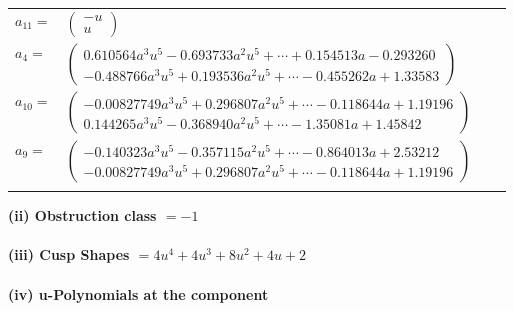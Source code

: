 \documentclass[1p]{elsarticle_modified}
\theoremstyle{definition}
\begin{document}
\begin{tabular}{m{7pt} m{180pt} m{7pt} m{180pt} }
\flushright $a_{11}=$&$\begin{pmatrix}- u\\u\end{pmatrix}$ \\
\flushright $a_{4}=$&$\begin{pmatrix}0.610564 a^{3} u^{5}-0.693733 a^{2} u^{5}+\cdots+0.154513 a-0.293260\\-0.488766 a^{3} u^{5}+0.193536 a^{2} u^{5}+\cdots-0.455262 a+1.33583\end{pmatrix}$ \\
\flushright $a_{10}=$&$\begin{pmatrix}-0.00827749 a^{3} u^{5}+0.296807 a^{2} u^{5}+\cdots-0.118644 a+1.19196\\0.144265 a^{3} u^{5}-0.368940 a^{2} u^{5}+\cdots-1.35081 a+1.45842\end{pmatrix}$ \\
\flushright $a_{9}=$&$\begin{pmatrix}-0.140323 a^{3} u^{5}-0.357115 a^{2} u^{5}+\cdots-0.864013 a+2.53212\\-0.00827749 a^{3} u^{5}+0.296807 a^{2} u^{5}+\cdots-0.118644 a+1.19196\end{pmatrix}$\\&\end{tabular}
\flushleft \textbf{(ii) Obstruction class $= -1$}\\~\\
\flushleft \textbf{(iii) Cusp Shapes $= 4 u^4+4 u^3+8 u^2+4 u+2$}\\~\\
\newpage\renewcommand{\arraystretch}{1}
\flushleft \textbf{(iv) u-Polynomials at the component}\newline \\
\end{document}
